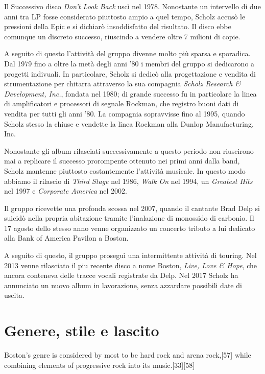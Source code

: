 \documentclass[class=book, crop=false, oneside, 12pt]{standalone}
\begin{document}
Il Successivo disco \emph{Don't Look Back} uscì nel 1978. Nonostante un intervello di due anni tra LP fosse considerato piuttosto ampio a quel tempo, Scholz accusò le pressioni della Epic e si dichiarò insoddisfatto del risultato. Il disco ebbe comunque un discreto successo, riuscindo a vendere oltre 7 milioni di copie.

A seguito di questo l'attività del gruppo divenne molto più sparsa e sporadica. Dal 1979 fino a oltre la metà degli anni '80 i membri del gruppo si dedicarono a progetti indivuali. In particolare, Scholz si dedicò alla progettazione e vendita di strumentazione per chitarra attraverso la sua compagnia \emph{Scholz Research \& Development, Inc.}, fondata nel 1980\cite{wiki:scholz_inc}; di grande successo fu in particolare la linea di amplificatori e processori di segnale Rockman, che registro buoni dati di vendita per tutti gli anni '80. La compagnia sopravvisse fino al 1995, quando Scholz stesso la chiuse e vendette la linea Rockman alla Dunlop Manufacturing, Inc\cite{wiki:scholz_inc}. 

Nonostante gli album rilasciati successivamente a questo periodo non riuscirono mai a replicare il successo prorompente ottenuto nei primi anni dalla band, Scholz mantenne piuttosto costantemente l'attività musicale. In questo modo abbiamo il rilascio di \emph{Third Stage} nel 1986, \emph{Walk On} nel 1994, un \emph{Greatest Hits} nel 1997 e \emph{Corporate America} nel 2002.

Il gruppo ricevette una profonda scossa nel 2007, quando il cantante Brad Delp si suicidò nella propria abitazione tramite l'inalazione di monossido di carbonio. Il 17 agosto dello stesso anno venne organizzato un concerto tributo a lui dedicato alla Bank of America Pavilon a Boston.

A seguito di questo, il gruppo proseguì una intermittente attività di touring. Nel 2013 venne rilasciato il piu recente disco a nome Boston, \emph{Live, Love \& Hope}, che ancora conteneva delle tracce vocali registrate da Delp. Nel 2017 Scholz ha annunciato un nuovo album in lavorazione, senza azzardare possibili date di uscita.

\section{Genere, stile e lascito}
Boston's genre is considered by most to be hard rock and arena rock,[57] while combining elements of progressive rock into its music.[33][58]
\end{document}

